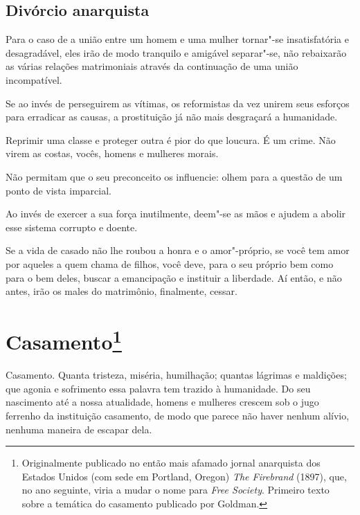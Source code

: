 \section{Divórcio anarquista}

Para o caso de a união entre um homem e uma mulher tornar"-se insatisfatória
e desagradável, eles irão de modo tranquilo e amigável separar"-se, não
rebaixarão as várias relações matrimoniais através da continuação de uma
união incompatível.

Se ao invés de perseguirem as vítimas, os reformistas da vez unirem seus
esforços para erradicar as causas, a prostituição já não mais
desgraçará a humanidade.

Reprimir uma classe e proteger outra é pior do que loucura. É um crime.
Não virem as costas, vocês, homens e mulheres morais.

Não permitam que o seu preconceito os influencie: olhem para a questão
de um ponto de vista imparcial.

Ao invés de exercer a sua força inutilmente, deem"-se as mãos e ajudem a
abolir esse sistema corrupto e doente.

Se a vida de casado não lhe roubou a honra e o amor"-próprio, se você tem
amor por aqueles a quem chama de filhos, você deve, para o seu próprio
bem como para o bem deles, buscar a emancipação e instituir a liberdade.
Aí então, e não antes, irão os males do matrimônio, finalmente, cessar.

\chapter{Casamento\footnote[*]{Originalmente publicado no então mais afamado jornal
  anarquista dos Estados Unidos (com sede em Portland, Oregon) \emph{The
  Firebrand} (1897), que, no ano seguinte, viria a mudar o nome para \emph{Free
    Society}. Primeiro texto sobre a temática do casamento publicado por
  Goldman.}}

Casamento. Quanta tristeza, miséria, humilhação; quantas lágrimas e maldições; que
agonia e sofrimento essa palavra tem trazido à humanidade. Do seu
nascimento até a nossa atualidade, homens e mulheres crescem sob o jugo
ferrenho da instituição casamento, de modo que parece não haver nenhum
alívio, nenhuma maneira de escapar dela.

